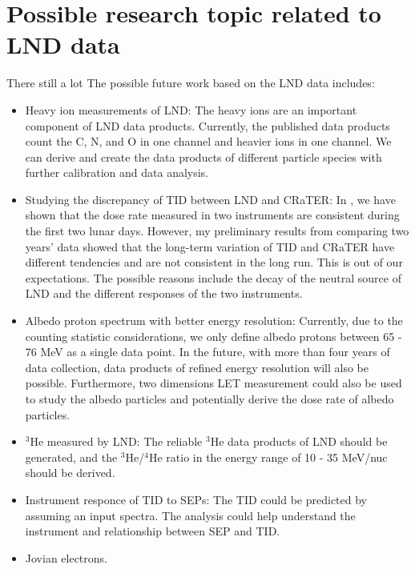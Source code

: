 \section*{Possible research topic related to LND data}
There still a lot 
The possible future work based on the \ac{LND} data includes:
\begin{itemize}

    \item Heavy ion measurements of \ac{LND}: The heavy ions are an important component of \ac{LND} data products. Currently, the published data products count the C, N, and O in one channel and heavier ions in one channel. We can derive and create the data products of different particle species with further calibration and data analysis.
    \item Studying the discrepancy of \ac{TID} between \ac{LND} and \ac{CRaTER}: In \citet{Zhang2020SciAdv}, we have shown that the dose rate measured in two instruments are consistent during the first two lunar days. However, my preliminary results from comparing two years' data showed that the long-term variation of \ac{TID} and \ac{CRaTER} have different tendencies and are not consistent in the long run. This is out of our expectations. The possible reasons include the decay of the neutral source of \ac{LND} and the different responses of the two instruments.
    \item Albedo proton spectrum with better energy resolution: Currently, due to the counting statistic considerations, we only define albedo protons between 65 - 76 MeV as a single data point. In the future, with more than four years of data collection, data products of refined energy resolution will also be possible. Furthermore, two dimensions \ac{LET} measurement could also be used to study the albedo particles and potentially derive the dose rate of albedo particles.
    \item $^3$He measured by \ac{LND}: The reliable $^3$He data products of \ac{LND} should be generated, and the $^3$He/$^4$He ratio in the energy range of 10 - 35 MeV/nuc should be derived.
    \item Instrument responce of \ac{TID} to \acp{SEP}: The \ac{TID} could be predicted by assuming an input spectra. The analysis could help understand the instrument and relationship between \ac{SEP} and \ac{TID}.
    \item Jovian electrons.



\end{itemize}

